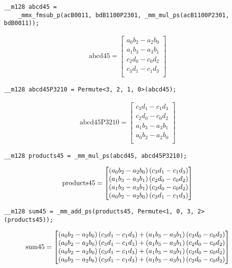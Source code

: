 \begin{verbatim}
__m128 abcd45 = 
    _mmx_fmsub_p(acB0011, bdB1100P2301, _mm_mul_ps(acB1100P2301, bdB0011));
\end{verbatim}

\begin{align*}
\mathrm{abcd45} 
=
\begin{bmatrix}
a_0b_2 - a_2b_0\\
a_1b_3 - a_3b_1\\
c_2d_0 - c_0d_2\\
c_3d_1 - c_1d_3\\
\end{bmatrix}
\end{align*}

\begin{verbatim}
__m128 abcd45P3210 = Permute<3, 2, 1, 0>(abcd45);
\end{verbatim}

\begin{align*}
\mathrm{abcd45P3210} 
=
\begin{bmatrix}
c_3d_1 - c_1d_3\\
c_2d_0 - c_0d_2\\
a_1b_3 - a_3b_1\\
a_0b_2 - a_2b_0\\
\end{bmatrix}
\end{align*}

\begin{verbatim}
__m128 products45 = _mm_mul_ps(abcd45, abcd45P3210);
\end{verbatim}

\begin{align*}
\mathrm{products45} 
=
\begin{bmatrix}
\left(a_0b_2 - a_2b_0\right)\left(c_3d_1 - c_1d_3\right)\\
\left(a_1b_3 - a_3b_1\right)\left(c_2d_0 - c_0d_2\right)\\
\left(a_1b_3 - a_3b_1\right)\left(c_2d_0 - c_0d_2\right)\\
\left(a_0b_2 - a_2b_0\right)\left(c_3d_1 - c_1d_3\right)\\
\end{bmatrix}
\end{align*}


\begin{verbatim}
__m128 sum45 = _mm_add_ps(products45, Permute<1, 0, 3, 2>(products45));
\end{verbatim}



\begin{align*}
\mathrm{sum45} 
=
\begin{bmatrix}
  \left(a_0b_2 - a_2b_0\right)\left(c_3d_1 - c_1d_3\right)
+ \left(a_1b_3 - a_3b_1\right)\left(c_2d_0 - c_0d_2\right)\\
  \left(a_0b_2 - a_2b_0\right)\left(c_3d_1 - c_1d_3\right)
+ \left(a_1b_3 - a_3b_1\right)\left(c_2d_0 - c_0d_2\right)\\
  \left(a_0b_2 - a_2b_0\right)\left(c_3d_1 - c_1d_3\right)
+ \left(a_1b_3 - a_3b_1\right)\left(c_2d_0 - c_0d_2\right)\\
  \left(a_0b_2 - a_2b_0\right)\left(c_3d_1 - c_1d_3\right)
+ \left(a_1b_3 - a_3b_1\right)\left(c_2d_0 - c_0d_2\right)\\
\end{bmatrix}
\end{align*}

